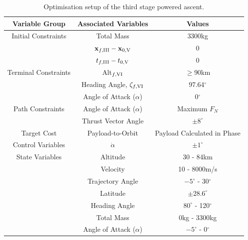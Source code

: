 \begin{table}[ht]
	\centering
\begin{tabular}{|c|c|c|}
\hline \textbf{Variable Group}  & \textbf{Associated Variables} & \textbf{Values}\\	\hline Initial Constraints  & Total Mass & 3300kg\\  & $\textbf{x}_{f,\textrm{\rom{3}}} - \textbf{x}_{0,\textrm{\rom{5}}}$ & 0\\ & $t_{f,\textrm{\rom{3}}} - t_{0,\textrm{\rom{5}}}$ & 0\\
	\hline Terminal Constraints & Alt$_{f,\textrm{\rom{6}}}$ & $\geq$90km\\ & Heading Angle, $\zeta_{f,\textrm{\rom{6}}}$ & 97.64$^\circ$\\  & Angle of Attack ($\alpha$) & 0$^\circ$\\
	\hline Path Constraints & Angle of Attack ($\alpha$) & Maximum $F_N$\\  & Thrust Vector Angle & $\pm8^\circ$\\ 
	\hline Target Cost & Payload-to-Orbit & Payload Calculated in Phase \rom{7}\\ 
				\hline Control Variables & $\dot{\alpha}$ & $\pm1^\circ$\\ 
				\hline State Variables & Altitude & 30 - 84km\\ & Velocity& 10 - 8000m/s\\ & Trajectory Angle& $-5^\circ$ - 30$^\circ$ \\   & Latitude&$\pm28.6^\circ$ \\   & Heading Angle& $80^\circ$ - 120$^\circ$\\  & Total Mass& 0kg - 3300kg \\  & Angle of Attack ($\alpha$)&  $-5^\circ$ - 0$^\circ$\\ 
	\hline 
\end{tabular} 
\caption{Optimisation setup of the third stage powered ascent.}
\end{table}

